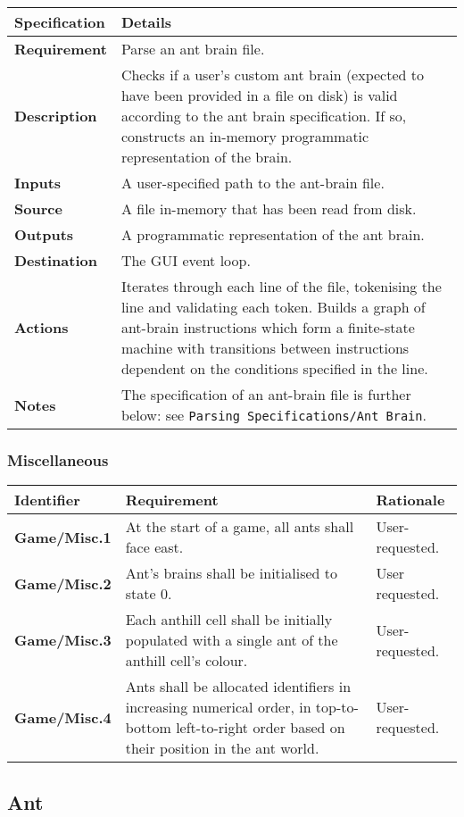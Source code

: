 \documentclass[11pt]{article}
\begin{document}
\begin{longtable}[c]{@{\extracolsep{\fill}}|p{}|p{}|@{}}
\hline
Specification & Details\tabularnewline
\hline

\textbf{Requirement} & Parse an ant brain file.\tabularnewline
\textbf{Description} & Checks if a user's custom ant brain (expected to
have been provided in a file on disk) is valid according to the ant
brain specification. If so, constructs an in-memory programmatic
representation of the brain.\tabularnewline
\textbf{Inputs} & A user-specified path to the ant-brain
file.\tabularnewline
\textbf{Source} & A file in-memory that has been read from
disk.\tabularnewline
\textbf{Outputs} & A programmatic representation of the ant
brain.\tabularnewline
\textbf{Destination} & The GUI event loop.\tabularnewline
\textbf{Actions} & Iterates through each line of the file, tokenising
the line and validating each token. Builds a graph of ant-brain
instructions which form a finite-state machine with transitions between
instructions dependent on the conditions specified in the
line.\tabularnewline
\textbf{Notes} & The specification of an ant-brain file is further
below: see \texttt{Parsing\ Specifications/Ant\ Brain}.\tabularnewline
\hline
\end{longtable}

\subsubsection*{Miscellaneous}\label{miscellaneous}

\begin{longtable}[c]{|p{}|p{}|p{}|}
\hline
Identifier & Requirement & Rationale\tabularnewline
\hline

\textbf{Game/Misc.1} & At the start of a game, all ants shall face east.
& User-requested.\tabularnewline
\textbf{Game/Misc.2} & Ant's brains shall be initialised to state 0. &
User requested.\tabularnewline
\textbf{Game/Misc.3} & Each anthill cell shall be initially populated
with a single ant of the anthill cell's colour. &
User-requested.\tabularnewline
\textbf{Game/Misc.4} & Ants shall be allocated identifiers in increasing
numerical order, in top-to-bottom left-to-right order based on their
position in the ant world. & User-requested.\tabularnewline
\hline
\end{longtable}

\subsection{Ant}\label{ant}
\end{document}

